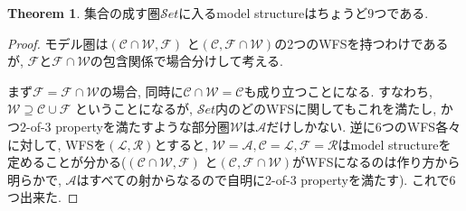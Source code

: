 \documentclass[. /main]{subfiles}
\theoremstyle{definition}
\newtheorem{theo}{Theorem}
\begin{document}
\begin{theo}
集合の成す圏$\mathcal{S}et$に入るmodel structureはちょうど9つである. 
\end{theo}
\begin{proof}
モデル圏は$(\mathcal{C} \cap \mathcal{W},  \mathcal{F})$ と$(\mathcal{C},  \mathcal{F} \cap \mathcal{W})$の2つのWFSを持つわけであるが, $\mathcal{F}$と$\mathcal{F} \cap \mathcal{W}$の包含関係で場合分けして考える. 

まず$\mathcal{F}=\mathcal{F} \cap \mathcal{W}$の場合, 同時に$\mathcal{C} \cap \mathcal{W}=\mathcal{C}$も成り立つことになる. すなわち, $\mathcal{W} \supseteq \mathcal{C} \cup \mathcal{F}$ ということになるが, $\mathcal{S}et$内のどのWFSに関してもこれを満たし, かつ2-of-3 propertyを満たすような部分圏$\mathcal{W}$は$\mathcal{A}$だけしかない. 逆に6つのWFS各々に対して, WFSを$(\mathcal{L},  \mathcal{R})$とすると, $\mathcal{W}=\mathcal{A},  \mathcal{C}=\mathcal{L},  \mathcal{F}=\mathcal{R}$はmodel structureを定めることが分かる($(\mathcal{C} \cap \mathcal{W},  \mathcal{F})$ と$(\mathcal{C},  \mathcal{F} \cap \mathcal{W})$がWFSになるのは作り方から明らかで, $\mathcal{A}$はすべての射からなるので自明に2-of-3 propertyを満たす). これで6つ出来た. 


\end{proof}
\end{document}
